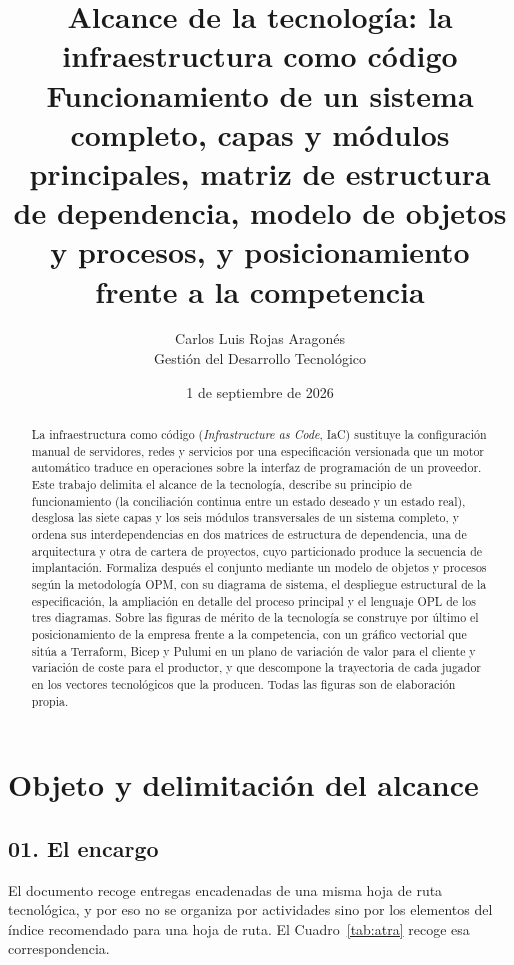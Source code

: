 \documentclass[11pt,letterpaper]{article}
\title{\textbf{Alcance de la tecnología: la infraestructura como código}\\
\large Funcionamiento de un sistema completo, capas y módulos principales,
matriz de estructura de dependencia, modelo de objetos y procesos, y
posicionamiento frente a la competencia}
\author{Carlos Luis Rojas Aragonés\\
Gestión del Desarrollo Tecnológico}
\date{1 de septiembre de 2026}
\newcommand{\subsec}[1]{%
  \subsection*{#1}%
  \phantomsection\addcontentsline{toc}{subsection}{#1}}
\begin{document}
\maketitle

\begin{abstract}
\noindent\small
La infraestructura como código (\emph{Infrastructure as Code}, IaC) sustituye
la configuración manual de servidores, redes y servicios por una
especificación versionada que un motor automático traduce en operaciones sobre
la interfaz de programación de un proveedor. Este trabajo delimita el alcance
de la tecnología, describe su principio de funcionamiento (la conciliación
continua entre un estado deseado y un estado real), desglosa las siete capas y
los seis módulos transversales de un sistema completo, y ordena sus
interdependencias en dos matrices de estructura de dependencia, una de
arquitectura y otra de cartera de proyectos, cuyo particionado produce la
secuencia de implantación. Formaliza después el conjunto mediante un modelo de
objetos y procesos según la metodología OPM, con su diagrama de sistema, el
despliegue estructural de la especificación, la ampliación en detalle del
proceso principal y el lenguaje OPL de los tres diagramas. Sobre las figuras
de mérito de la tecnología se construye por último el posicionamiento de la
empresa frente a la competencia, con un
gráfico vectorial que sitúa a Terraform, Bicep y Pulumi en un plano de
variación de valor para el cliente y variación de coste para el productor, y
que descompone la trayectoria de cada jugador en los vectores tecnológicos que
la producen. Todas las figuras son de elaboración propia.
\end{abstract}

\clearpage
\setcounter{tocdepth}{2}
{\setlength{\parskip}{0pt}\tableofcontents}
\clearpage

\section{Objeto y delimitación del alcance}
\label{sec:alcance}

\subsec{01. El encargo}

El documento recoge entregas encadenadas de una misma hoja de ruta
tecnológica, y por eso no se organiza por actividades sino por los elementos
del índice recomendado para una hoja de ruta. El Cuadro~\ref{tab:atra} recoge
esa correspondencia.
\end{document}
